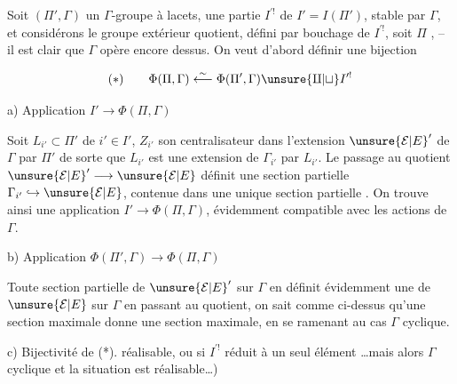 Soit  $(\Pi',\Gamma)$ un $\Gamma$-groupe 
à lacets,   une partie
$I^{\prime!}$ de $I'=I(\Pi')$, stable par $\Gamma$,
et considérons le groupe extérieur quotient, défini par bouchage de $I^{\prime!}$,
soit $\Pi$ , -- il est clair que $\Gamma$ opère encore dessus.
On veut d'abord définir une bijection

\[
(*)\qquad\Phi(\Pi,\Gamma)\overset{\sim}{\longleftarrow}
\Phi(\Pi',\Gamma)\unsure{\amalg|\sqcup} I^{\prime!}
\]

a) Application $I'\longrightarrow\Phi(\Pi,\Gamma)$

Soit $L_{i'}\subset\Pi'$ de  $i'\in I'$, $Z_{i'}$ son centralisateur dans l'extension $\unsure{\mathcal E|E}'$ de $\Gamma$ par $\Pi'$
de sorte que $L_{i'}$ est une extension de $\Gamma_{i'}$
par $L_{i'}$. Le passage au quotient $\unsure{\mathcal E|E}'\longrightarrow\unsure{\mathcal E|E}$
définit une section partielle $\Gamma_{i'}\hookrightarrow\unsure{\mathcal E|E}$,
contenue dans une unique section partielle 
.
On trouve ainsi une application $I'\longrightarrow\Phi(\Pi,\Gamma)$,
évidemment compatible avec les actions de $\Gamma$.

b) Application $\Phi(\Pi',\Gamma)\longrightarrow\Phi(\Pi,\Gamma)$

Toute section partielle  de $\unsure{\mathcal E|E}'$ sur $\Gamma$ en définit
évidemment une de $\unsure{\mathcal E|E}$ sur $\Gamma$ en passant au
quotient, on sait comme ci-dessus qu'une
section maximale donne une section maximale,
en se ramenant au cas $\Gamma$ cyclique.

c) Bijectivité de (*).  
réalisable, ou si $I^{\prime!}$ réduit à un seul élément
\ldots mais alors $\Gamma$ cyclique et la situation est réalisable\ldots)
